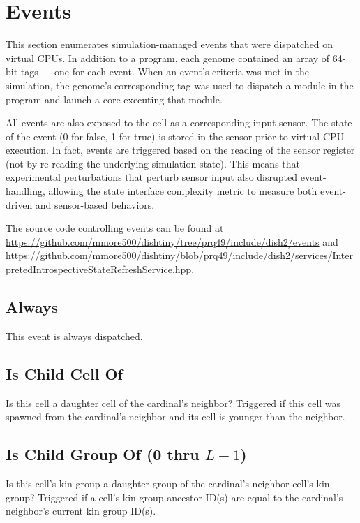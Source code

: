 \section{Events}

This section enumerates simulation-managed events that were dispatched on virtual CPUs.
In addition to a program, each genome contained an array of 64-bit tags --- one for each event.
When an event's criteria was met in the simulation, the genome's corresponding tag was used to dispatch a module in the program and launch a core executing that module.

All events are also exposed to the cell as a corresponding input sensor.
The state of the event (0 for false, 1 for true) is stored in the sensor prior to virtual CPU execution.
In fact, events are triggered based on the reading of the sensor register (not by re-reading the underlying simulation state).
This means that experimental perturbations that perturb sensor input also disrupted event-handling, allowing the state interface complexity metric to measure both event-driven and sensor-based behaviors.

The source code controlling events can be found at \url{https://github.com/mmore500/dishtiny/tree/prq49/include/dish2/events} and \url{https://github.com/mmore500/dishtiny/blob/prq49/include/dish2/services/InterpretedIntrospectiveStateRefreshService.hpp}.

\subsection{Always}

This event is always dispatched.

\subsection{Is Child Cell Of}

Is this cell a daughter cell of the cardinal's neighbor?
Triggered if this cell was spawned from the cardinal's neighbor and its cell is younger than the neighbor.

\subsection{Is Child Group Of (0 thru $L-1$)}

Is this cell's kin group a daughter group of the cardinal's neighbor cell's kin group?
Triggered if a cell's kin group ancestor ID(s) are equal to the cardinal's neighbor's current kin group ID(s).

